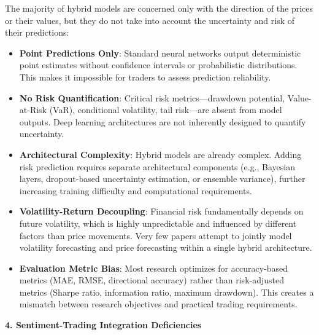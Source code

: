 The majority of hybrid models are concerned only with the direction of the prices or their values, but they do not take into account the uncertainty and risk of their predictions:
\begin{itemize}
    \item \textbf{Point Predictions Only}: Standard neural networks output deterministic point estimates without confidence intervals or probabilistic distributions. This makes it impossible for traders to assess prediction reliability.
    
    \item \textbf{No Risk Quantification}: Critical risk metrics---drawdown potential, Value-at-Risk (VaR), conditional volatility, tail risk---are absent from model outputs. Deep learning architectures are not inherently designed to quantify uncertainty.
    
    \item \textbf{Architectural Complexity}: Hybrid models are already complex. Adding risk prediction requires separate architectural components (e.g., Bayesian layers, dropout-based uncertainty estimation, or ensemble variance), further increasing training difficulty and computational requirements.
    
    \item \textbf{Volatility-Return Decoupling}: Financial risk fundamentally depends on future volatility, which is highly unpredictable and influenced by different factors than price movements. Very few papers attempt to jointly model volatility forecasting and price forecasting within a single hybrid architecture.
    
    \item \textbf{Evaluation Metric Bias}: Most research optimizes for accuracy-based metrics (MAE, RMSE, directional accuracy) rather than risk-adjusted metrics (Sharpe ratio, information ratio, maximum drawdown). This creates a mismatch between research objectives and practical trading requirements.
\end{itemize}

\textbf{4. Sentiment-Trading Integration Deficiencies}

